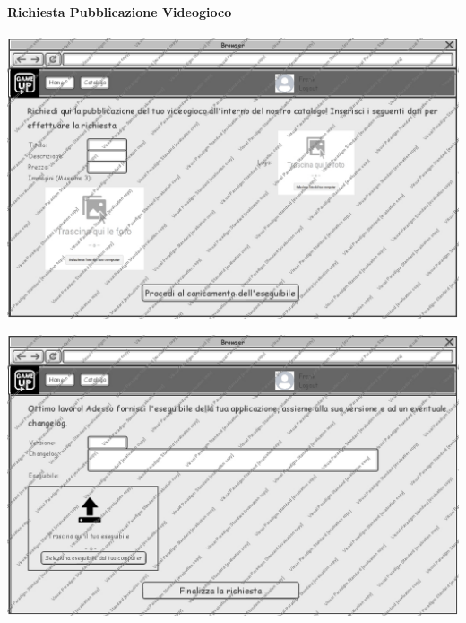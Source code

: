 \paragraph{Richiesta Pubblicazione Videogioco}
\begin{center}
\includegraphics[width=\textwidth,height=\textheight,keepaspectratio]{Figure/Mockups/RichiestaPubblicazioneVideogioco1.jpg}
\end{center}

\newpage
\begin{center}
\includegraphics[width=\textwidth,height=\textheight,keepaspectratio]{Figure/Mockups/RichiestaPubblicazioneVideogioco2.jpg}
\end{center}

\newpage
